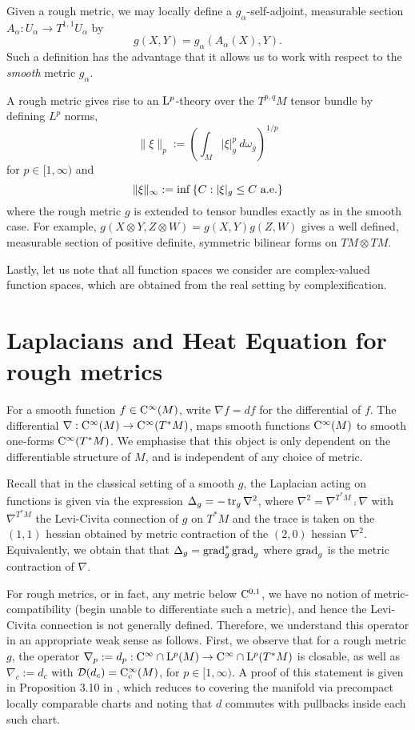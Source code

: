 \documentclass[a4paper, 12pt]{amsart}
\begin{document}
Given a rough metric, we may locally define a \(g_{\alpha}\)-self-adjoint, measurable section \(A_{\alpha} : U_{\alpha} \to T^{1,1}U_{\alpha}\) by
\[
g(X, Y) = g_{\alpha} (A_{\alpha} (X), Y).
\]
Such a definition has the advantage that it allows us to work with respect to the \emph{smooth} metric \(g_{\alpha}\).

A rough metric gives rise to an $\Lp{p}$-theory over the $T^{p,q}M$ tensor bundle by defining \(L^p\) norms,
\[
\|\xi\|_p := \left(\int_{M} |\xi|_{g}^p\ d\omega_g\right)^{1/p}
\]
for $p \in [1, \infty)$ and
\[
\|\xi\|_{\infty} := \inf\set{C: |\xi|_g \leq C\ \text{a.e.}}
\]
where the rough metric \(g\) is extended to tensor bundles exactly as in the smooth case. For example, \(g(X \otimes Y, Z \otimes W) = g(X, Y) g(Z, W)\) gives a well defined, measurable section of positive definite, symmetric bilinear forms on \(TM \otimes TM\).

Lastly, let us note that all function spaces we consider are complex-valued function spaces, which are obtained from the real setting by complexification.


\section{Laplacians and Heat Equation for rough metrics}


For a smooth function \(f \in \Ck{\infty}(M)\), write \(\nabla f = df\) for the differential of \(f\). 
The differential \(\nabla : \Ck{\infty}(M) \to \Ck{\infty}(T^{\ast} M)\), maps smooth functions 
\(\Ck{\infty}(M)\) to smooth one-forms \(\Ck{\infty}(T^{\ast} M)\). 
We emphasise that this object is only dependent on the differentiable structure of $M$, and is independent of any choice of metric.

Recall that in the classical setting of a smooth $g$,  the Laplacian acting on functions is given  via the expression $\Delta_g = - \tr_g \nabla^2$, where $\nabla^2 = \nabla^{T^\ast M} \comp \nabla$
with $\nabla^{T^\ast M}$ the Levi-Civita connection of $g$ on \(T^{\ast} M\) and the trace is taken on the \((1,1)\) hessian obtained by metric contraction of the \((2, 0)\) hessian \(\nabla^2\). Equivalently, we obtain that  that \(\Delta_g = \grad_g^\ast \grad_g\) where \(\grad_g\) is the metric contraction of \(\nabla\).

For rough metrics, or in fact, any metric below $\Ck{0,1}$, we have no notion of metric-compatibility (begin unable to differentiate such a metric), and hence the Levi-Civita connection is not generally defined. Therefore, we understand this operator in an appropriate weak sense as follows. First, we observe that for a rough metric $g$, the operator
$\nabla_p := d_p: \Ck{\infty} \cap \Lp{p}(M) \to \Ck{\infty} \cap \Lp{p}(T^\ast M)$
is closable, as well as $\nabla_c := d_c$ with $\dom(d_c) = \Ck[c]{\infty}(M)$,
for $p \in [1, \infty)$. A proof of this statement is given in Proposition 3.10 in \cite{BRough}, 
which reduces to covering the manifold via precompact locally comparable
charts and noting that $d$ commutes with pullbacks inside each such chart.
\end{document}

